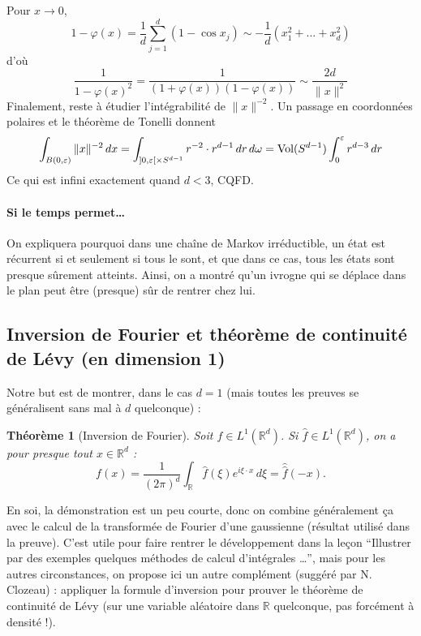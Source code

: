 \documentclass[a4paper, 11pt]{article}
\def\R{\mathbb{R}}
\newtheorem*{theorem}{Théorème}
\begin{document}
Pour $x \to 0$,
\[ 1 - \varphi(x) = \frac{1}{d} \sum_{j=1}^d (1 - \cos x_j) \sim
  -\frac{1}{d}(x_1^2 + \ldots + x_d^2) \] d'où
\[\frac{1}{1 - \varphi(x)^2} = \frac{1}{(1 + \varphi(x))(1 - \varphi(x))} \sim
  \frac{2d}{\|x\|^2} \]
Finalement, reste à étudier l'intégrabilité de $\|x\|^{-2}$. Un passage en
coordonnées polaires et le théorème de Tonelli donnent
\[ \int_{B(0,\varepsilon)} \|x\|^{-2}\,dx = \int_{]0,\varepsilon[ \times S^{d-1}}
  r^{-2} \cdot r^{d-1}\,dr\,d\omega = \textnormal{Vol}(S^{d-1}) \int_0^\varepsilon
  r^{d-3}\,dr \]
Ce qui est infini exactement quand $d < 3$, CQFD.

\paragraph{Si le temps permet…} On expliquera pourquoi dans une chaîne de Markov
irréductible, un état est récurrent si et seulement si tous le sont, et que dans
ce cas, tous les états sont presque sûrement atteints. Ainsi, on a montré qu'un
ivrogne qui se déplace dans le plan peut être (presque) sûr de rentrer chez lui.

\newpage

\subsection{Inversion de Fourier et théorème de continuité de Lévy (en dimension 1)}

Notre but est de montrer, dans le cas $d = 1$ (mais toutes les preuves se
généralisent sans mal à $d$ quelconque) :

\begin{theorem}[Inversion de Fourier]
  Soit $f \in L^1(\R^d)$. Si $\hat{f} \in L^1(\R^d)$, on a pour presque
  tout $x \in \R^d$ :
\[ f(x) = \frac{1}{(2\pi)^d} \int_\R \hat{f}(\xi) e^{i\xi \cdot x} \,d\xi =
  \hat{\hat{f}}(-x). \]
\end{theorem}

En soi, la démonstration est un peu courte, donc on combine généralement ça avec
le calcul de la transformée de Fourier d'une gaussienne (résultat utilisé dans
la preuve). C'est utile pour faire rentrer le développement dans la leçon
\enquote{Illustrer par des exemples quelques méthodes de calcul d'intégrales …},
mais pour les autres circonstances, on propose ici un autre complément (suggéré
par N. Clozeau) : appliquer la formule d'inversion pour prouver le théorème de
continuité de Lévy (sur une variable aléatoire dans $\R$ quelconque, pas
forcément à densité !).
\end{document}
